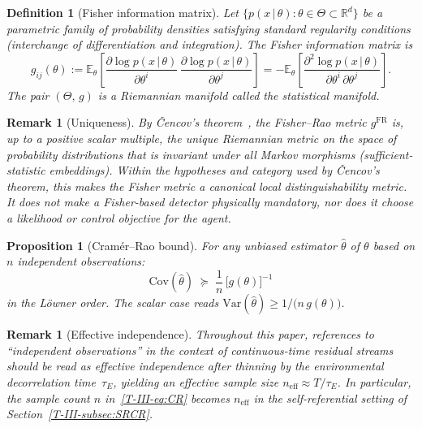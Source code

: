 \documentclass[12pt,a4paper,openany]{book}
\newtheorem{proposition}[theorem]{Proposition}
\newtheorem{definition}[theorem]{Definition}
\newtheorem{remark}[theorem]{Remark}
\begin{document}
\begin{definition}[Fisher information matrix]
\label{T-III-def:fisher}
Let $\{p(x\,|\,\theta) : \theta \in \Theta
\subset \mathbb{R}^d\}$ be a parametric family of
probability densities satisfying standard regularity
conditions (interchange of differentiation and integration).
The \emph{Fisher information matrix} is
\begin{equation}
\label{T-III-eq:fisher_def}
g_{ij}(\theta)
:= \mathbb{E}_\theta\!\left[
  \frac{\partial \log p(x\,|\,\theta)}
       {\partial \theta^i}\,
  \frac{\partial \log p(x\,|\,\theta)}
       {\partial \theta^j}
\right]
= -\mathbb{E}_\theta\!\left[
  \frac{\partial^2 \log p(x\,|\,\theta)}
       {\partial \theta^i\,\partial \theta^j}
\right].
\end{equation}
The pair $(\Theta,\,g)$ is a Riemannian manifold called the
\emph{statistical manifold}.
\end{definition}

\begin{remark}[Uniqueness]
\label{T-III-rem:cencov}
By \v{C}encov's theorem~\cite{Cencov1982}, the Fisher--Rao
metric $g^{\mathrm{FR}}$ is, up to a positive scalar
multiple, the unique Riemannian metric on the space of
probability distributions that is invariant under all
Markov morphisms (sufficient-statistic embeddings).
Within the hypotheses and category used by \v{C}encov's theorem, this
makes the Fisher metric a canonical local distinguishability metric.
It does not make a Fisher-based detector physically mandatory, nor does
it choose a likelihood or control objective for the agent.
\end{remark}

\begin{proposition}[Cram\'{e}r--Rao bound]
\label{T-III-prop:CR}
For any unbiased estimator $\hat{\theta}$ of $\theta$ based
on $n$ independent observations:
\begin{equation}
\label{T-III-eq:CR}
\mathrm{Cov}(\hat{\theta})
\;\succeq\; \frac{1}{n}\,\bigl[g(\theta)\bigr]^{-1}
\end{equation}
in the L\"{o}wner order.
The scalar case reads
$\mathrm{Var}(\hat{\theta})
\geq 1/\bigl(n\,g(\theta)\bigr)$.
\end{proposition}

\begin{remark}[Effective independence]
\label{T-III-rem:effective_independence}
Throughout this paper, references to ``independent
observations'' in the context of continuous-time residual
streams should be read as \emph{effective independence}
after thinning by the environmental decorrelation
time~$\tau_E$, yielding an effective sample size
$n_{\mathrm{eff}} \approx T/\tau_E$.
In particular, the sample count $n$ in~\eqref{T-III-eq:CR}
becomes $n_{\mathrm{eff}}$ in the self-referential
setting of Section~\ref{T-III-subsec:SRCR}.
\end{remark}
\end{document}
